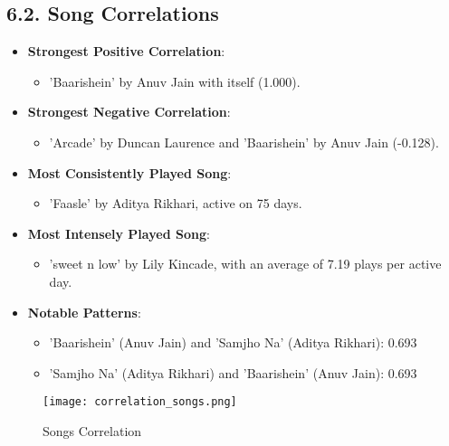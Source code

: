 \documentclass[12pt]{article}
\begin{document}
\begin{itemize}
\subsection*{6.2. Song Correlations}
\begin{itemize}
    \item \textbf{Strongest Positive Correlation}:
    \begin{itemize}
        \item 'Baarishein' by Anuv Jain with itself (1.000).
    \end{itemize}
    \item \textbf{Strongest Negative Correlation}:
    \begin{itemize}
        \item 'Arcade' by Duncan Laurence and 'Baarishein' by Anuv Jain (-0.128).
    \end{itemize}
    \item \textbf{Most Consistently Played Song}:
    \begin{itemize}
        \item 'Faasle' by Aditya Rikhari, active on 75 days.
    \end{itemize}
    \item \textbf{Most Intensely Played Song}:
    \begin{itemize}
        \item 'sweet n low' by Lily Kincade, with an average of 7.19 plays per active day.
    \end{itemize}
    \item \textbf{Notable Patterns}:
    \begin{itemize}
        \item 'Baarishein' (Anuv Jain) and 'Samjho Na' (Aditya Rikhari): 0.693
        \item 'Samjho Na' (Aditya Rikhari) and 'Baarishein' (Anuv Jain): 0.693
    \end{itemize}
\end{itemize}
\begin{figure}[H]
    \centering
    \texttt{[image: correlation\_songs.png]}
    \caption{Songs Correlation}
    \label{fig:enter-label}
\end{figure}

\end{itemize}
\end{document}
